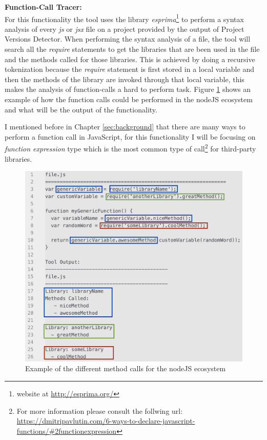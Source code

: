 \textbf{Function-Call Tracer:}\\
For this functionality the tool uses the library \textit{esprima}\footnote{website at \url{http://esprima.org/}} to perform a syntax analysis of every \textit{js} or \textit{jsx} file on a project provided by the output of Project Versions Detector. 
\enlargethispage{\baselineskip}
When performing the syntax analysis of a file, the tool will search all the \textit{require} statements to get the libraries that are been used in the file and the methods called for those libraries. This is achieved by doing a recursive tokenization because the \textit{require} statement is first stored in a local variable and then the methods of the library are invoked through that local variable, this makes the analysis of function-calls a hard to perform task. Figure \ref{fig:libExamples} shows an example of how the function calls could be performed in the nodeJS ecosystem and what will be the output of the functionality. 

I mentioned before in Chapter \ref{sec:background} that there are many ways to perform a function call in JavaScript, for this functionality I will be focusing on \textit{function expression} type which is the most common type of call\footnote{For more information please consult the follwing url: \url{https://dmitripavlutin.com/6-ways-to-declare-javascript-functions/\#2functionexpression}} for third-party libraries. 

\begin{figure}[ht!]
\centering
\includegraphics[width=1\textwidth]{images/libraries_example.png}
\caption{Example of the different method calls for the nodeJS ecosystem}
\label{fig:libExamples}
\end{figure}


